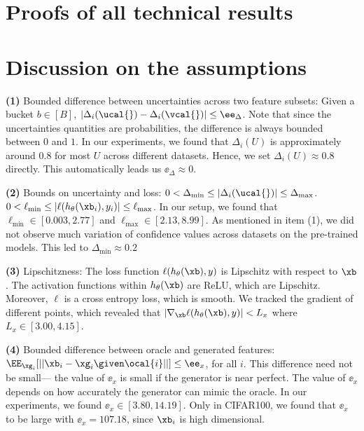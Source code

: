 \documentclass[letterpaper]{article}
\begin{document}
\newpage
\section{Proofs of all technical results}
\label{app:proofs}



\section{Discussion on the assumptions}
\label{app:assump}
\textbf{(1)} Bounded difference between uncertainties across two feature subsets: Given a bucket $b\in [B]$, $|\Delta_i(\ucal{}) - \Delta_i(\vcal{})| \le \ee_{\Delta}$.  Note that since the uncertainties quantities are probabilities, the difference is always bounded between $0$ and $1$.
In our experiments, we found that $\Delta_i(U)$ is approximately around $0.8$ for most $U$ across different datasets. Hence, we set $\Delta_i(U) \approx 0.8$ directly. This automatically leads us $\ee_\Delta \approx 0$.


\textbf{(2)} Bounds on uncertainty and loss: 
$0< \Delta_{\min} \le |\Delta_i(\ucal{})| \le \Delta_{\max} $.
$ 0< \ell_{\min} \le |\ell(h_\theta(\xb_i),y_i)| \le \ell_{\max}$. 
In our setup, we found that $\ell_{\min} \in [0.003, 2.77]$ and  $\ell_{\max} \in [2.13, 8.99]$. As mentioned in item (1), we did not observe much variation of confidence values across datasets on the pre-trained models. This led to $\Delta_{\min}\approx 0.2$

\textbf{(3)} Lipschitzness: The loss function $\ell(h_\theta(\xb),y)$ is Lipschitz with respect to $\xb$. The activation functions within $h_{\theta}(\xb)$ 
are ReLU, which are Lipschitz. Moreover, $\ell$ is a  cross entropy loss, which is smooth. We tracked the gradient of different points, which revealed that $|\nabla_{\xb}\ell(h_\theta(\xb),y)|< L_x$ where $L_x \in [{3.00}, 4.15]$.

\textbf{(4)} Bounded difference between oracle and generated features: $\EE_{\xg_i}[||\xb_i-\xg_i \given \ocal{i}||] \le \ee_x$, for all $i$.  This difference need not be small--- the value of $\ee_x$ is small if the generator is near perfect.  The value of $\ee_x$ depends on how accurately the generator can mimic the oracle.  In our experiments, we found $\ee_x \in [3.80,14.19]$. Only in CIFAR100, we found that $\ee_x$ to be large with $\ee_x =  107.18$, since $\xb_i$ is high dimensional.
\end{document}
